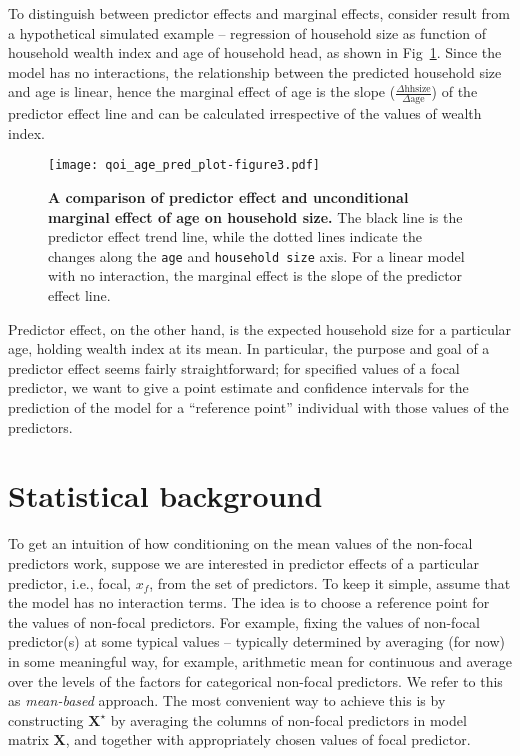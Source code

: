\documentclass[10pt,letterpaper]{article}
\def\code#1{\texttt{#1}}
\newcommand{\bX}{{\mathbf X}}
\begin{document}

To distinguish between predictor effects and marginal effects, consider result from a hypothetical  simulated example -- regression of household size as function of household wealth index and age of household head, as shown in Fig~\ref{fig:qoi_age_pred_plot}. Since the model has no interactions, the relationship between the predicted household size and age is linear, hence the marginal effect of age is the slope ($\frac{\Delta \mathrm{hh size}}{\Delta \mathrm{age}}$) of the predictor effect line and can be calculated irrespective of the values of wealth index.

\begin{figure}[!h]
\centering
\texttt{[image: qoi\_age\_pred\_plot-figure3.pdf]}
\caption{{\bf A comparison of predictor effect and unconditional marginal effect of age on household size.} The black line is the predictor effect trend line, while the dotted lines indicate the changes along the \code{age} and \code{household size} axis. For a linear model with no interaction, the marginal effect is the slope of the predictor effect line.}
\label{fig:qoi_age_pred_plot}
\end{figure}

Predictor effect, on the other hand, is the expected household size for a particular age, holding wealth index at its mean. In particular, the purpose and goal of a predictor effect seems fairly straightforward; for specified values of a focal predictor, we want to give a point estimate and confidence intervals for the prediction of the model for a ``reference point'' individual with those values of the predictors.

\section*{Statistical background}

To get an intuition of how conditioning on the mean values of the non-focal predictors work, suppose we are interested in predictor effects of a particular predictor, i.e., focal, $x_f$, from the set of predictors. To keep it simple, assume that the model has no interaction terms. The idea is to choose a reference point for the values of non-focal predictors. For example, fixing the values of non-focal predictor(s) at some typical values -- typically determined by averaging (for now) in some meaningful way, for example, arithmetic mean  for continuous and average over the levels of the factors for categorical non-focal predictors. We refer to this as \emph{mean-based} approach. The most convenient way to achieve this is by constructing $\bX^\star$ by averaging the columns of non-focal predictors in model matrix $\bX$, and together with appropriately chosen values of focal predictor.
\end{document}
